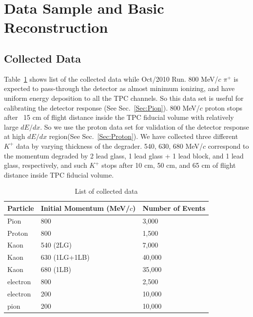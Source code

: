 \section{Data Sample and Basic Reconstruction}
\subsection{Collected Data}
Table~\ref{Table:Data} shows list of the collected data while Oct/2010 Run.
800 MeV/$c$ $\pi^+$ is expected to pass-through the detector as almost minimum ionizing,
and have uniform energy deposition to all the TPC channels.
So this data set is useful for calibrating the detector response (See Sec.~\ref{Sec:Pion}).
800 MeV/$c$ proton stops after ~15 cm of flight distance inside the TPC fiducial volume
with relatively large $dE/dx$. So we use the proton data set for validation of the
detector response at high $dE/dx$ region(See Sec.~\ref{Sec:Proton}).
We have collected three different $K^+$ data by varying thickness of the degrader. 
540, 630, 680 MeV/$c$ correspond to the momentum degraded by 
2 lead glass, 1 lead glass + 1 lead block, and 1 lead glass, respectively, 
and such $K^+$ stops after 10 cm, 50 cm, and 65 cm of flight distance inside TPC fiducial volume.

\begin{table}[h]
\begin{center}
\caption{List of collected data}
\begin{tabular}{l|ll}
  Particle  &Initial Momentum (MeV/$c$) &Number of Events\\
\hline
  Pion      &800                &3,000\\
  Proton    &800                &1,500\\
  Kaon      &540 (2LG)          &7,000\\
  Kaon      &630 (1LG+1LB)      &40,000\\
  Kaon      &680 (1LB)          &35,000\\
  electron  &800                &2,500\\
  electron  &200                &10,000\\
  pion      &200                &10,000\\
\end{tabular}
\label{Table:Data}
\end{center}
\end{table}

